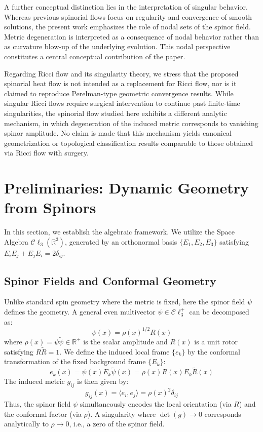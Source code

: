 \documentclass[11pt, reqno, a4paper]{amsart}
\theoremstyle{definition}
\theoremstyle{remark}
\newcommand{\Cl}{\mathcal{C}\ell_3}
\newcommand{\R}{\mathbb{R}}
\begin{document}
A further conceptual distinction lies in the interpretation of singular
behavior. Whereas previous spinorial flows focus on regularity and convergence of smooth
solutions, the present work emphasizes the role of nodal sets of the spinor
field. Metric degeneration is interpreted as a consequence of nodal behavior rather
than as curvature blow-up of the underlying evolution. This nodal perspective constitutes a central conceptual contribution of the paper.

Regarding Ricci flow and its singularity theory, we stress that the proposed
spinorial heat flow is not intended as a replacement for Ricci flow, nor is it
claimed to reproduce Perelman-type geometric convergence results.
While singular Ricci flows require surgical intervention to continue past
finite-time singularities, the spinorial flow studied here exhibits a different
analytic mechanism, in which degeneration of the induced metric corresponds to
vanishing spinor amplitude.
No claim is made that this mechanism yields canonical geometrization or
topological classification results comparable to those obtained via Ricci flow
with surgery.

\section{Preliminaries: Dynamic Geometry from Spinors}

In this section, we establish the algebraic framework. We utilize the Space Algebra $\Cl(\R^3)$, generated by an orthonormal basis $\{E_1, E_2, E_3\}$ satisfying $E_i E_j + E_j E_i = 2\delta_{ij}$.

\subsection{Spinor Fields and Conformal Geometry}
Unlike standard spin geometry where the metric is fixed, here the spinor field $\psi$ defines the geometry. A general even multivector $\psi \in \Cl^+$ can be decomposed as:
\begin{equation}
    \psi(x) = \rho(x)^{1/2} R(x)
\end{equation}
where $\rho(x) = \psi \tilde{\psi} \in \R^+$ is the scalar amplitude and $R(x)$ is a unit rotor satisfying $R\tilde{R}=1$.
We define the induced local frame $\{e_k\}$ by the conformal transformation of the fixed background frame $\{E_k\}$:
\begin{equation} \label{eq:frame_def}
    e_k(x) = \psi(x) E_k \tilde{\psi}(x) = \rho(x) R(x) E_k \tilde{R}(x)
\end{equation}
The induced metric $g_{ij}$ is then given by:
\begin{equation}
    g_{ij}(x) = \langle e_i, e_j \rangle = \rho(x)^2 \delta_{ij}
\end{equation}
Thus, the spinor field $\psi$ simultaneously encodes the local orientation (via $R$) and the conformal factor (via $\rho$). A singularity where $\det(g) \to 0$ corresponds analytically to $\rho \to 0$, i.e., a zero of the spinor field.
\end{document}
